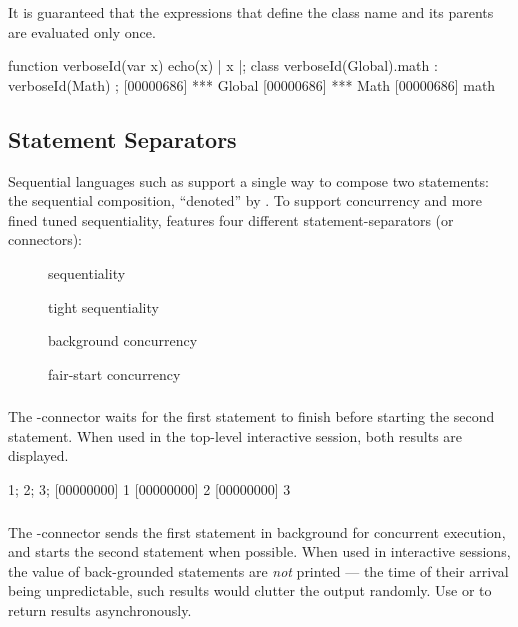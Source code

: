 It is guaranteed that the expressions that define the class name and its
parents are evaluated only once.

\begin{urbiscript}
function verboseId(var x)
{
  echo(x) | x
}|;
class verboseId(Global).math : verboseId(Math)
{
};
[00000686] *** Global
[00000686] *** Math
[00000686] math
\end{urbiscript}


\subsection{Statement Separators}
\label{sec:lang:separators}

Sequential languages such as \Cxx support a single way to compose two
statements: the sequential composition, ``denoted'' by \samp{;}.  To
support concurrency and more fined tuned sequentiality, \us features
four different statement-separators (or connectors):
\begin{description}
\item[\samp{;}] sequentiality
\item[\samp{|}] tight sequentiality
\item[\samp{,}] background concurrency
\item[\samp{\&}] fair-start concurrency
\end{description}

\subsubsection{\samp{;}}

The \samp{;}-connector waits for the first statement to finish before
starting the second statement.  When used in the top-level interactive
session, both results are displayed.

\begin{urbiscript}
1; 2; 3;
[00000000] 1
[00000000] 2
[00000000] 3
\end{urbiscript}

\subsubsection{\samp{,}}
\label{sec:lang:comma}
The \samp{,}-connector sends the first statement in background for
concurrent execution, and starts the second statement when possible.
When used in interactive sessions, the value of back-grounded
statements are \emph{not} printed --- the time of their arrival being
unpredictable, such results would clutter the output randomly.  Use
 or  to return results
asynchronously.

